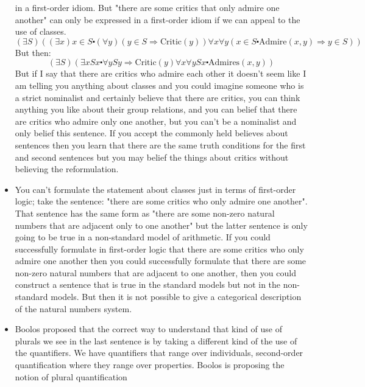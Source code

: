\documentclass[12pt]{article}
\theoremstyle{definition}
\begin{document}
\begin{itemize}
        in a first-order idiom. But "there are some critics that only admire
        one another" can only be expressed in a first-order idiom if we can
        appeal to the use of classes. 
        $$(\exists S)((\exists x) x \in S \centerdot (\forall y)(y \in S
        \Rightarrow \mathrm{Critic}(y)) \forall x \forall y(x \in S \centerdot
        \mathrm{Admire}(x, y) \Rightarrow y \in S))$$
        But then:
        $$(\exists S)(\exists x Sx \centerdot \forall y Sy \Rightarrow
        \mathrm{Critic}(y) \forall x \forall y S x \centerdot
        \mathrm{Admires}(x, y))$$
        But if I say that there are critics who admire each other it doesn't
        seem like I am telling you anything about classes and you could imagine
        someone who is a strict nominalist and certainly believe that there are
        critics, you can think anything you like about their group relations,
        and you can belief that there are critics who admire only one another,
        but you can't be a nominalist and only belief this sentence. If you
        accept the commonly held believes about sentences then you learn that
        there are the same truth conditions for the first and second sentences
        but you may belief the things about critics without believing the
        reformulation.
    \item
        You can't formulate the statement about classes just in terms of
        first-order logic; take the sentence: "there are some critics who only
        admire one another". That sentence has the same form as "there are some
        non-zero natural numbers that are adjacent only to one another" but the
        latter sentence is only going to be true in a non-standard model of
        arithmetic. If you could successfully formulate in first-order logic
        that there are some critics who only admire one another then you could
        successfully formulate that there are some non-zero natural numbers
        that are adjacent to one another, then you could construct a sentence
        that is true in the standard models but not in the non-standard models.
        But then it is not possible to give a categorical description of the
        natural numbers system.
    \item
        Boolos proposed that the correct way to understand that kind of use of
        plurals we see in the last sentence is by taking a different kind of
        the use of the quantifiers. We have quantifiers that range over
        individuals, second-order quantification where they range over
        properties. Boolos is proposing the notion of plural quantification

\end{itemize}
\end{document}
